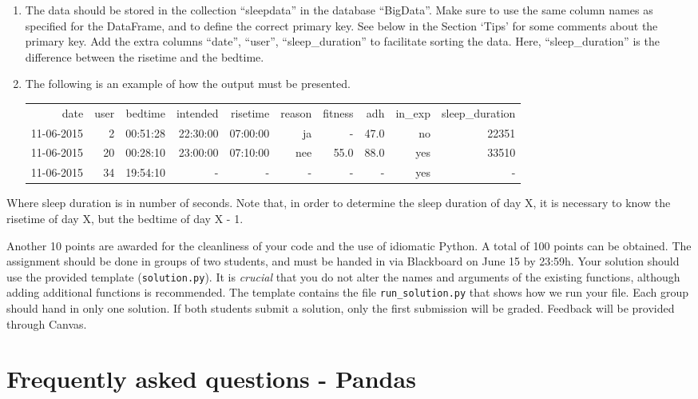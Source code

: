 \documentclass[a4paper]{report}
\theoremstyle{definition}
\begin{document}
\begin{enumerate}
	\item The data should be stored in the collection ``sleepdata'' in the database ``BigData''.  Make sure to use the same column names as specified for the DataFrame, and to define the correct primary key. See below in the Section `Tips' for some comments about the primary key. Add the extra columns ``date'', ``user'', ``sleep\_duration'' to facilitate sorting the data. Here, ``sleep\_duration'' is the difference between the risetime and the bedtime.
	
	\item The following is an example of how the output must be presented.


	\begin{tabular}{|r r r r r r r r r r|}
		\hline
		date		& user	& bedtime	& intended	& risetime	& reason	& fitness	& adh	& in\_exp	& sleep\_duration	\\
		11-06-2015	& 2		& 00:51:28	& 22:30:00	& 07:00:00	& ja		& -			& 47.0	& no		&	22351 			\\
		11-06-2015	& 20	& 00:28:10	& 23:00:00	& 07:10:00	& nee		& 55.0		& 88.0	& yes		&	33510			\\
		11-06-2015	& 34	& 19:54:10	& -			& -			& -			& -			& -		& yes		&       -			\\
		\hline
	\end{tabular}
\end{enumerate}

Where sleep duration is in number of seconds. Note that, in order to determine the sleep duration of day X, it is necessary to know the risetime of day X, but the bedtime of day X - 1.

Another 10 points are awarded for the cleanliness of your code and the use of idiomatic Python. A total of 100 points can be obtained. The assignment should be done in groups of two students, and must be handed in via Blackboard on June 15 by 23:59h. Your solution should use the provided template (\texttt{\small solution.py}). It is \emph{crucial} that you do not alter the names and arguments of the existing functions, although adding additional functions is recommended. The template contains the file \texttt{\small run\_solution.py} that shows how we run your file. Each group should hand in only one solution. If both students submit a solution, only the first submission will be graded. Feedback will be provided through Canvas.

\section*{Frequently asked questions - Pandas}
\end{document}
